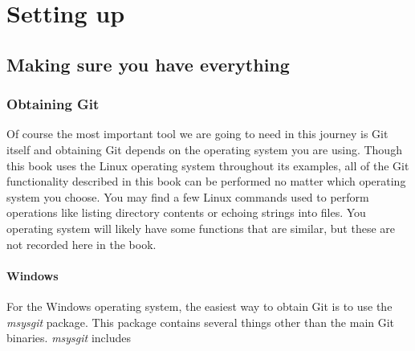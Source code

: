 \cleardoublepage
\chapter{Setting up}
\section{Making sure you have everything}
\subsection{Obtaining Git}
Of course the most important tool we are going to need in this journey is Git itself and obtaining Git depends on the operating system you are using.
Though this book uses the Linux operating system throughout its examples,
all of the Git functionality described in this book can be performed no matter which operating system you choose.
You may find a few Linux commands used to perform operations like listing directory contents or echoing strings into files.
You operating system will likely have some functions that are similar, but these are not recorded here in the book.

\subsubsection{Windows}
For the Windows operating system, the easiest way to obtain Git is to use the \emph{msysgit} package.
This package contains several things other than the main Git binaries.
\emph{msysgit} includes
